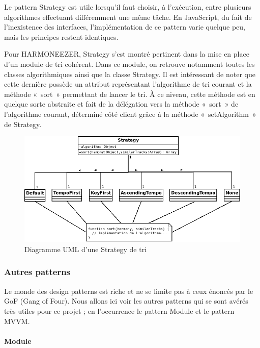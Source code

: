 \documentclass[a4paper,12pt]{article}
\begin{document}
Le pattern Strategy est utile lorsqu'il faut choisir, à l'exécution, entre plusieurs algorithmes effectuant différemment une même tâche. En JavaScript, du fait de l'inexistence des interfaces, l'implémentation de ce pattern varie quelque peu, mais les principes restent identiques.

Pour HARMONEEZER, Strategy s'est montré pertinent dans la mise en place d'un module de tri cohérent. Dans ce module, on retrouve notamment toutes les classes algorithmiques ainsi que la classe Strategy. Il est intéressant de noter que cette dernière possède un attribut représentant l'algorithme de tri courant et la méthode «~sort~» permettant de lancer le tri. À ce niveau, cette méthode est en quelque sorte abstraite et fait de la délégation vers la méthode «~sort~» de l'algorithme courant, déterminé côté client grâce à la méthode «~setAlgorithm~» de Strategy.

\begin{figure}[!h]
  \begin{center}
    \includegraphics[scale=0.5]{Strategy.png}
    \caption{Diagramme UML d'une Strategy de tri}
  \end{center}
\end{figure}

\newpage

\subsubsection{Autres patterns}

Le monde des design patterns est riche et ne se limite pas à ceux énoncés par le GoF (Gang of Four). Nous allons ici voir les autres patterns qui se sont avérés très utiles pour ce projet ; en l'occurrence le pattern Module et le pattern MVVM.

\paragraph{Module}
\end{document}
